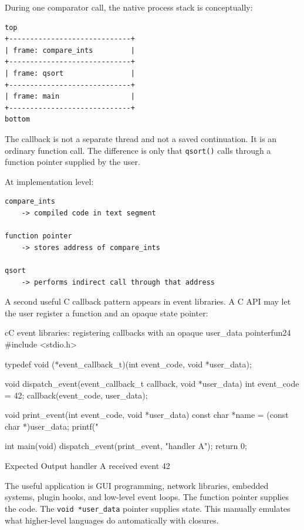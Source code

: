 \documentclass[a4paper,twoside]{report}
\begin{document}
During one comparator call, the native process stack is conceptually:

\begin{verbatim}
top
+-----------------------------+
| frame: compare_ints         |
+-----------------------------+
| frame: qsort                |
+-----------------------------+
| frame: main                 |
+-----------------------------+
bottom
\end{verbatim}

The callback is not a separate thread and not a saved continuation. It is an ordinary function call. The difference is only that \texttt{qsort()} calls through a function pointer supplied by the user.

At implementation level:

\begin{verbatim}
compare_ints
    -> compiled code in text segment

function pointer
    -> stores address of compare_ints

qsort
    -> performs indirect call through that address
\end{verbatim}

A second useful C callback pattern appears in event libraries. A C API may let the user register a function and an opaque state pointer:

\begin{codebox}[]{c}{C event libraries: registering callbacks with an opaque user\_data pointer}{fun24}
#include <stdio.h>

typedef void (*event_callback_t)(int event_code, void *user_data);

void dispatch_event(event_callback_t callback, void *user_data) {
    int event_code = 42;
    callback(event_code, user_data);
}

void print_event(int event_code, void *user_data) {
    const char *name = (const char *)user_data;
    printf("%
}

int main(void) {
    dispatch_event(print_event, "handler A");
    return 0;
}
\end{codebox}


\begin{iobox}{Expected Output}
handler A received event 42 \\
\end{iobox}



The useful application is GUI programming, network libraries, embedded systems, plugin hooks, and low-level event loops. The function pointer supplies the code. The \texttt{void *user\_data} pointer supplies state. This manually emulates what higher-level languages do automatically with closures.
\end{document}
